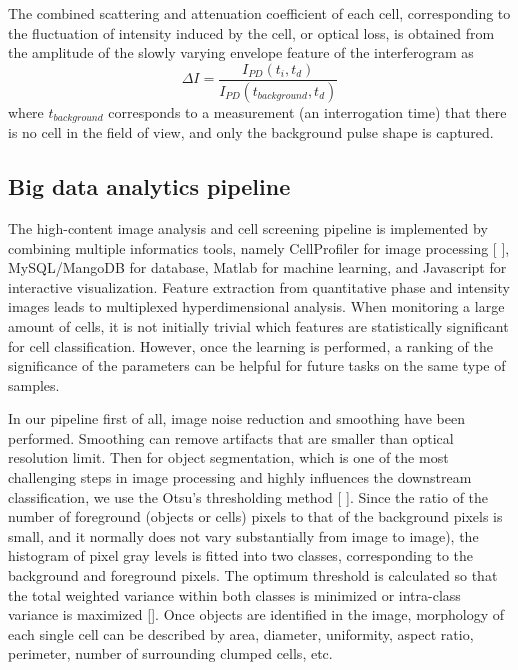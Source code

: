 \documentclass[aps,pra,reprint,superscriptaddress]{revtex4-1}
\begin{document}
The combined scattering and attenuation coefficient of each cell, corresponding to the fluctuation of intensity induced by the cell, or optical loss, is obtained from the amplitude of the slowly varying envelope feature of the interferogram as
\begin{equation}
\Delta I = \frac{I_{PD}(t_i,t_d)}{I_{PD}(t_{background},t_d)}
\end{equation}
where $t_{background}$ corresponds to a measurement (an interrogation time) that there is no cell in the field of view, and only the background pulse shape is captured. 

\subsection{Big data analytics pipeline}

The high-content image analysis and cell screening pipeline is implemented by combining multiple informatics tools, namely CellProfiler for image processing [ ], MySQL/MangoDB for database, Matlab for machine learning, and Javascript for interactive visualization. 
Feature extraction from quantitative phase and intensity images leads to multiplexed hyperdimensional analysis. When monitoring a large amount of cells, it is not initially trivial which features are statistically significant for cell classification. However, once the learning is performed, a ranking of the significance of the parameters can be helpful for future tasks on the same type of samples. 

In our pipeline first of all, image noise reduction and smoothing have been performed. Smoothing can remove artifacts that are smaller than optical resolution limit. Then for object segmentation, which is one of the most challenging steps in image processing and highly influences the downstream classification, we use the Otsu’s thresholding method [ ]. Since the ratio of the number of foreground (objects or cells) pixels to that of the background pixels is small, and it normally does not vary substantially from image to image), the histogram of pixel gray levels is fitted into two classes,  corresponding to the background and foreground pixels. The optimum threshold is calculated so that the total weighted variance within both classes is minimized or intra-class variance is maximized []. Once objects are identified in the image, morphology of each single cell can be described by area, diameter, uniformity, aspect ratio, perimeter, number of surrounding clumped cells, etc.
\end{document}
